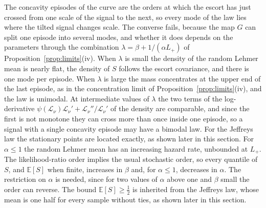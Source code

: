 \documentclass[sn-mathphys-num]{sn-jnl}\newcommand{\SNJNL}{}
\theoremstyle{thmstyleone}
\theoremstyle{thmstyletwo}
\theoremstyle{thmstylethree}
\theoremstyle{thmstyleone}
\providecommand{\E}{\mathbb{E}}
\providecommand{\Leh}{\mathscr{L}}
\begin{document}
	The concavity episodes of the curve are the orders at which the
	escort has just crossed from one scale of the signal to the next, so
	every mode of the law lies where the tilted signal changes scale.
	The converse fails, because the map $G$ can split one episode into
	several modes, and whether it does depends on the parameters through
	the combination $\lambda=\beta+1/(\alpha L_+)$ of
	Proposition~\ref{prop:limits}(iv). When $\lambda$ is small the
	density of the random Lehmer mean is nearly flat, the density of $S$
	follows the escort covariance, and there is one mode per episode.
	When $\lambda$ is large the mass concentrates at the upper end of
	the last episode, as in the concentration limit of
	Proposition~\ref{prop:limits}(iv), and the law is unimodal. At
	intermediate values of $\lambda$ the two terms of the
	log-derivative $\psi(\Leh_\nu)\Leh_\nu'+\Leh_\nu''/\Leh_\nu'$ of the
	density are comparable, and since the first is not monotone they
	can cross more than once inside one episode, so a signal with a
	single concavity episode may have a bimodal law. For the Jeffreys
	law the stationary points are located exactly, as shown later in
	this section. For $\alpha\le1$ the random Lehmer mean has an
	increasing hazard rate, unbounded at $L_+$. The likelihood-ratio
	order implies the usual stochastic order, so every quantile of $S$,
	and $\E[S]$ when finite, increases in $\beta$ and, for $\alpha\le1$,
	decreases in $\alpha$. The restriction on $\alpha$ is needed, since
	for two values of $\alpha$ above one and $\beta$ small the order can
	reverse. The bound $\E[S]\ge\tfrac12$ is inherited from the Jeffreys
	law, whose mean is one half for every sample without ties, as shown
	later in this section.
	
\end{document}
